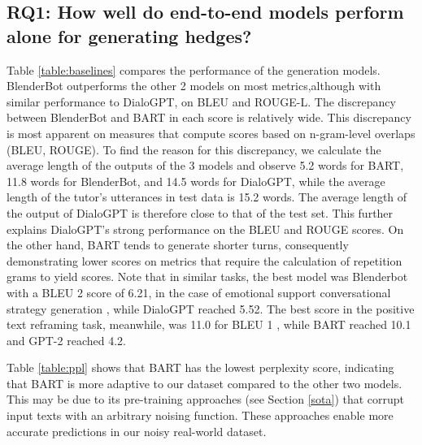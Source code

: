 \documentclass[11pt]{article}
\begin{document}
\subsection{RQ1: How well do end-to-end models perform alone for generating hedges?} \label{RQ1}

Table \ref{table:baselines} compares the performance of the generation models. BlenderBot outperforms the other 2 models on most metrics,although with similar performance to DialoGPT, on BLEU and ROUGE-L. The discrepancy between BlenderBot and BART in each score is relatively wide. This discrepancy is most apparent on measures that compute scores based on n-gram-level overlaps (BLEU, ROUGE). To find the reason for this discrepancy, we calculate the average length of the outputs of the 3 models and observe 5.2 words for BART, 11.8 words for BlenderBot, and 14.5 words for DialoGPT, while the average length of the tutor's utterances in test data is 15.2 words.  The average length of the output of DialoGPT is therefore close to that of the test set. This further explains DialoGPT's strong performance on the BLEU and ROUGE scores. On the other hand, BART tends to generate shorter turns, consequently demonstrating lower scores on metrics that require the calculation of repetition grams to yield scores. Note that in similar tasks, the best model  was Blenderbot with a BLEU 2 score of 6.21, in the case of emotional support conversational strategy generation \citep{liu2021towards}, while DialoGPT reached 5.52. The best score in the positive text reframing task, meanwhile, was 11.0 for BLEU 1 \citep{ziems-etal-2022-inducing}, while BART reached 10.1 and GPT-2 reached 4.2.

Table \ref{table:ppl} shows that BART has the lowest perplexity score, indicating that BART is more adaptive to our dataset compared to the other two models. This may be due to its pre-training approaches (see Section \ref{sota}) that corrupt input texts with an arbitrary noising function. These approaches enable more accurate predictions in our noisy real-world dataset.


\begin{table}[!ht]
    \centering
    \caption{\footnotesize{Language Model (LM) Perplexity (the lower is the better}}
    \label{table:ppl}
\end{table}
\end{document}
